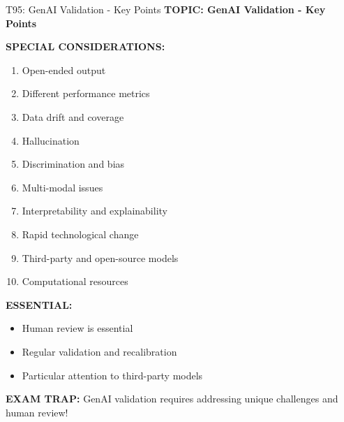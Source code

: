 \documentclass[8pt]{beamer}
\begin{document}
	\begin{frame}{T95: GenAI Validation - Key Points}
		\fontsize{6.5}{7.5}\selectfont
		\textbf{TOPIC: GenAI Validation - Key Points}
		
		\vspace{0.1cm}
		\textbf{SPECIAL CONSIDERATIONS:}
		\begin{enumerate}
			\item Open-ended output
			\item Different performance metrics
			\item Data drift and coverage
			\item Hallucination
			\item Discrimination and bias
			\item Multi-modal issues
			\item Interpretability and explainability
			\item Rapid technological change
			\item Third-party and open-source models
			\item Computational resources
		\end{enumerate}
		
		\vspace{0.1cm}
		\textbf{ESSENTIAL:}
		\begin{itemize}
			\item Human review is essential
			\item Regular validation and recalibration
			\item Particular attention to third-party models
		\end{itemize}
		
		\textcolor{myred}{\textbf{EXAM TRAP:}} GenAI validation requires \textcolor{myblue}{addressing unique challenges and human review}!
	\end{frame}
	
\end{document}

